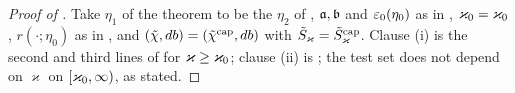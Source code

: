\begin{proof}[Proof of ]
Take $\eta_1$ of the theorem to be the $\eta_2$ of , $\mathfrak a,\mathfrak b$ and $\varepsilon_0(\eta_0)$ as in , $\varkappa_0=\varkappa_0$, $r(\cdot;\eta_0)$ as in , and $(\tilde\chi,db)=(\tilde\chi^{\mathrm{cap}},db)$ with $\tilde S_\varkappa=\tilde S^{\mathrm{cap}}_\varkappa$. Clause (i) is the second and third lines of  for $\varkappa\ge\varkappa_0$; clause (ii) is ; the test set does not depend on $\varkappa$ on $[\varkappa_0,\infty)$, as stated.
\end{proof}
